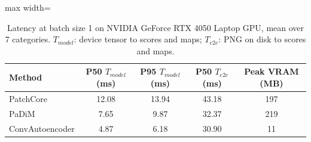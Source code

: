 \begin{table}[tbp]
\centering
\small
\caption{Latency at batch size 1 on NVIDIA GeForce RTX 4050 Laptop GPU, mean over 7 categories. $T_{model}$: device tensor to scores and maps; $T_{e2e}$: PNG on disk to scores and maps.}
\label{tab:latency}
\begin{adjustbox}{max width=\linewidth}
\begin{tabular}{lcccc}
\toprule
\textbf{Method} & \textbf{P50 $T_{model}$ (ms)} & \textbf{P95 $T_{model}$ (ms)} & \textbf{P50 $T_{e2e}$ (ms)} & \textbf{Peak VRAM (MB)} \\
\midrule
PatchCore & 12.08 & 13.94 & 43.18 & 197 \\
PaDiM & 7.65 & 9.87 & 32.37 & 219 \\
ConvAutoencoder & 4.87 & 6.18 & 30.90 & 11 \\
\bottomrule
\end{tabular}
\end{adjustbox}
\end{table}
